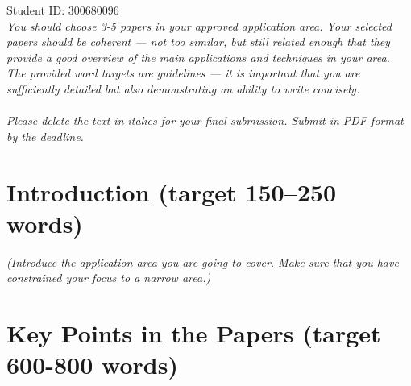 \documentclass{article}[11pt]
\begin{document}
\noindent Student ID: 300680096 \\
\noindent \textit{You should choose 3-5 papers in your approved application area. Your selected papers should be coherent --- not too similar, but still related enough that they provide a good overview of the main applications and techniques in your area. The provided word targets are guidelines --- it is important that you are sufficiently detailed but also demonstrating an ability to write concisely.\\ \\
Please delete the text in italics for your final submission. Submit in PDF format by the deadline.
}

\section*{Introduction (target 150--250 words)}
\begin{mdframed}[] %
\textit{(Introduce the application area you are going to cover. Make sure that you have constrained your focus to a narrow area.)}
\end{mdframed}

\section*{Key Points in the Papers (target 600-800 words)}
\end{document}
